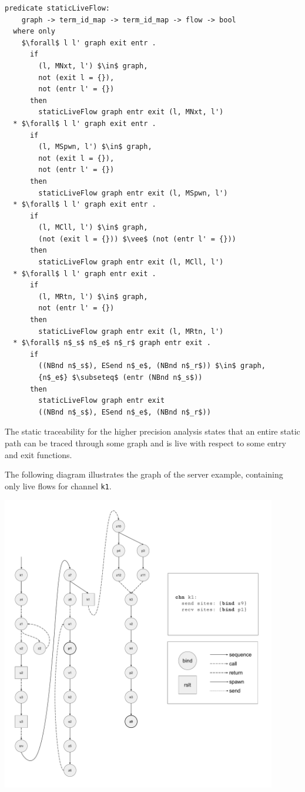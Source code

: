 \documentclass[letterpaper, 11pt]{extarticle}
\begin{document}
\begin{lstlisting}[language=logic, mathescape]
  predicate staticLiveFlow:
    graph -> term_id_map -> term_id_map -> flow -> bool
  where only
    $\forall$ l l' graph exit entr . 
      if
        (l, MNxt, l') $\in$ graph,
        not (exit l = {}),
        not (entr l' = {})
      then
        staticLiveFlow graph entr exit (l, MNxt, l')
  * $\forall$ l l' graph exit entr .
      if
        (l, MSpwn, l') $\in$ graph, 
        not (exit l = {}),
        not (entr l' = {})
      then
        staticLiveFlow graph entr exit (l, MSpwn, l')
  * $\forall$ l l' graph exit entr .
      if
        (l, MCll, l') $\in$ graph,
        (not (exit l = {})) $\vee$ (not (entr l' = {}))
      then
        staticLiveFlow graph entr exit (l, MCll, l')
  * $\forall$ l l' graph entr exit .
      if
        (l, MRtn, l') $\in$ graph,
        not (entr l' = {})
      then
        staticLiveFlow graph entr exit (l, MRtn, l')
  * $\forall$ n$_s$ n$_e$ n$_r$ graph entr exit .
      if
        ((NBnd n$_s$), ESend n$_e$, (NBnd n$_r$)) $\in$ graph, 
        {n$_e$} $\subseteq$ (entr (NBnd n$_s$))
      then
        staticLiveFlow graph entr exit
        ((NBnd n$_s$), ESend n$_e$, (NBnd n$_r$))
\end{lstlisting}

The static traceability for the higher precision analysis states
that an entire static path can be traced through some graph and
is live with respect to some entry and exit functions.

The following diagram illustrates the graph of the server example,
containing only live flows for channel \lstinline{k1}. \

\includegraphics[width=0.9\textwidth]{cml-graph-k1.pdf}
\end{document}
